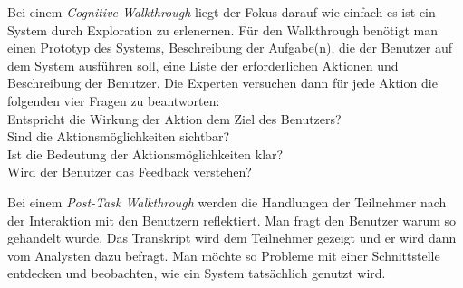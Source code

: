  Bei einem \textit{Cognitive Walkthrough} liegt der Fokus darauf wie einfach es ist ein System durch Exploration zu erlenernen.
 Für den Walkthrough benötigt man einen Prototyp des Systems, Beschreibung der Aufgabe(n), die der Benutzer auf dem System ausführen
 soll, eine Liste der erforderlichen Aktionen und Beschreibung der Benutzer. Die Experten versuchen dann für jede Aktion die 
 folgenden vier Fragen zu beantworten:
 \\
Entspricht die Wirkung der Aktion dem Ziel des Benutzers?
\\
Sind die Aktionsmöglichkeiten sichtbar?
\\
Ist die Bedeutung der Aktionsmöglichkeiten klar?
\\
Wird der Benutzer das Feedback verstehen? 



Bei einem \textit{Post-Task Walkthrough} werden die Handlungen der Teilnehmer nach der Interaktion mit den Benutzern reflektiert.
Man fragt den Benutzer warum so gehandelt wurde.
Das Transkript wird dem Teilnehmer gezeigt und er wird dann vom Analysten dazu befragt.
Man möchte so Probleme mit einer Schnittstelle entdecken und beobachten, wie ein System tatsächlich genutzt wird. 
